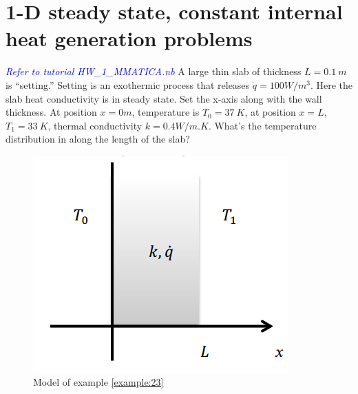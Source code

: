 \begin{solution}
\begin{enumerate}
\end{enumerate}
\end{solution}

\section{1-D steady state, constant	internal heat generation problems}
\begin{example}
\label{example:23}
\textcolor{blue} {\emph{Refer to tutorial HW\_1\_MMATICA.nb}}
A large thin slab of thickness $L=0.1~m$ is “setting.” Setting is an exothermic process 
that releases $\dot{q}=100W/m^3$. Here the slab heat conductivity is in steady state. 
Set the x-axis along with the wall thickness. At position $x=0m$, temperature is $T_0=37~K$,
at position $x=L$,$T_1=33~K$, thermal conductivity $k=0.4W/m.K$. What’s the
temperature distribution in along the length of the slab? 
\begin{figure}[H]
  \centering
    \includegraphics[scale=0.6]{figures/ch2/6}
    \caption{Model of example \ref{example:23}}
    \label{fig:2:6}
\end{figure}
\end{example}

